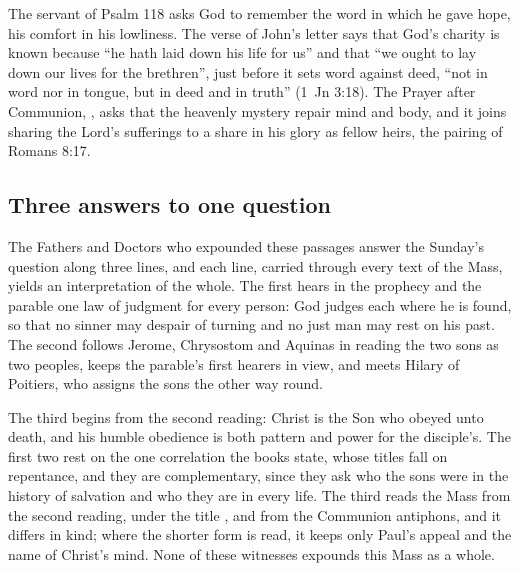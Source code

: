 The servant of Psalm 118 asks God to remember the word in which he gave hope,
his comfort in his lowliness. The verse of John's letter says that God's
charity is known because ``he hath laid down his life for us'' and that ``we
ought to lay down our lives for the brethren'', just before it sets word
against deed, ``not in word nor in tongue, but in deed and in truth'' (1~Jn
3:18). The Prayer after Communion, , asks that the heavenly mystery repair mind and body, and it joins
sharing the Lord's sufferings to a share in his glory as fellow heirs, the
pairing of Romans 8:17.

\subsection{Three answers to one question}

The Fathers and Doctors who expounded these passages answer the Sunday's
question along three lines, and each line, carried through every text of the
Mass, yields an interpretation of the whole. The first hears in the prophecy
and the parable one law of judgment for every person: God judges each where he
is found, so that no sinner may despair of turning and no just man may rest on
his past. The second follows Jerome, Chrysostom and Aquinas in reading the two
sons as two peoples, keeps the parable's first hearers in view, and meets
Hilary of Poitiers, who assigns the sons the other way round.

The third begins from the second reading: Christ is the Son who obeyed unto
death, and his humble obedience is both pattern and power for the disciple's.
The first two rest on the one correlation the books state, whose titles fall on
repentance, and they are complementary, since they ask who the sons were in the
history of salvation and who they are in every life. The third reads the Mass
from the second reading, under the title , and from the
Communion antiphons, and it differs in kind; where the shorter form is read, it
keeps only Paul's appeal and the name of Christ's mind. None of these witnesses
expounds this Mass as a whole.
